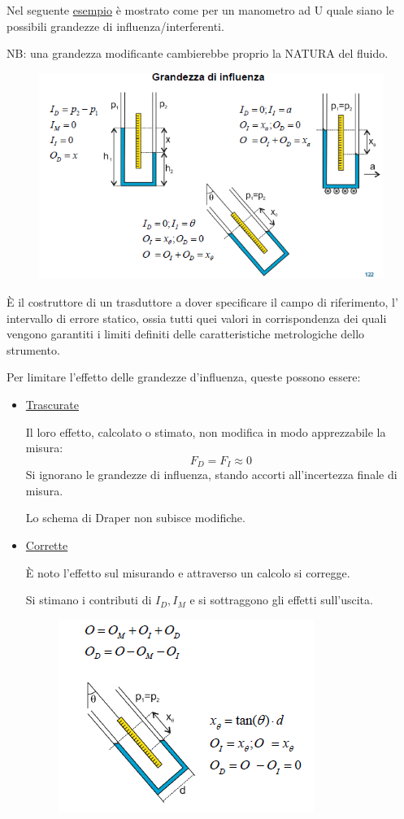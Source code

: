 \documentclass[a4paper, 15pt]{article}
\begin{document}
\begin{adjustwidth}{2in}{}
	Nel seguente \underline{esempio} è mostrato come per un manometro ad U quale siano le possibili grandezze di influenza/interferenti.
	
	NB: una grandezza modificante cambierebbe proprio la NATURA del fluido.	
\begin{figure}[H]
	\centering
	\includegraphics[width=0.7\linewidth]{fig/screenshot029}

	\label{fig:screenshot029}
\end{figure}
	È il costruttore di un trasduttore a dover specificare il campo di
	riferimento, l' intervallo di errore
	statico, ossia tutti quei valori in corrispondenza dei quali vengono garantiti i limiti
	definiti delle caratteristiche metrologiche dello strumento. \newline 
	
	Per limitare l'effetto delle grandezze d'influenza, queste possono essere: 
	\begin{itemize}
		\item \underline{Trascurate}  
		
		Il loro effetto, calcolato o stimato, non modifica in
		modo apprezzabile la misura:
		\[F_D = F_I \approx 0\]
		Si ignorano le grandezze di influenza, stando accorti all'incertezza finale di misura. \newline
		
		Lo schema di Draper non subisce modifiche.
		
		\item \underline{Corrette} 
		
		È noto l’effetto sul misurando e attraverso un calcolo si  corregge.
		
		Si stimano i contributi di $I_D, I_M$ e si sottraggono gli effetti sull'uscita. 		
\begin{figure}[H]
	\centering
	\includegraphics[width=0.5\linewidth]{fig/screenshot030}
	\label{fig:screenshot030}
\end{figure}
	

\end{itemize}
\end{adjustwidth}
\end{document}
